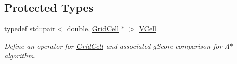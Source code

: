 \subsection*{Protected Types}
\begin{DoxyCompactItemize}
\item 
typedef std\+::pair$<$ double, \hyperlink{classGridCell}{Grid\+Cell} $\ast$ $>$ \hyperlink{classGridMap_a3589e78d066f9c12b000f85f870afbc4}{V\+Cell}\hypertarget{classGridMap_a3589e78d066f9c12b000f85f870afbc4}{}\label{classGridMap_a3589e78d066f9c12b000f85f870afbc4}

\begin{DoxyCompactList}\small\item\em Define an operator for \hyperlink{classGridCell}{Grid\+Cell} and associated g\+Score comparison for A$\ast$ algorithm. \end{DoxyCompactList}\end{DoxyCompactItemize}
